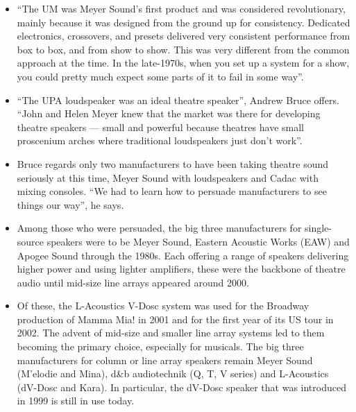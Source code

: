 \documentclass[12pt]{article}
\begin{document}
\begin{itemize}
            \item ``The UM was Meyer Sound's first product and was considered revolutionary, mainly because it was designed from the ground up for consistency. Dedicated electronics, crossovers, and presets delivered very consistent performance from box to box, and from show to show. This was very different from the common approach at the time. In the late-1970s, when you set up a system for a show, you could pretty much expect some parts of it to fail in some way''.
            \item ``The UPA loudspeaker was an ideal theatre speaker'', Andrew Bruce offers. ``John and Helen Meyer knew that the market was there for developing theatre speakers --- small and powerful because theatres have small proscenium arches where traditional loudspeakers just don't work''.
            \item Bruce regards only two manufacturers to have been taking theatre sound seriously at this time, Meyer Sound with loudspeakers and Cadac with mixing consoles. ``We had to learn how to persuade manufacturers to see things our way'', he says.
            \item Among those who were persuaded, the big three manufacturers for single-source speakers were to be Meyer Sound, Eastern Acoustic Works (EAW) and Apogee Sound through the 1980s. Each offering a range of speakers delivering higher power and using lighter amplifiers, these were the backbone of theatre audio until mid-size line arrays appeared around 2000.
            \item Of these, the L-Acoustics V-Dosc system was used for the Broadway production of Mamma Mia! in 2001 and for the first year of its US tour in 2002. The advent of mid-size and smaller line array systems led to them becoming the primary choice, especially for musicals. The big three manufacturers for column or line array speakers remain Meyer Sound (M'elodie and Mina), d\&b audiotechnik (Q, T, V series) and L-Acoustics (dV-Dosc and Kara). In particular, the dV-Dosc speaker that was introduced in 1999 is still in use today.
        \end{itemize}
    \nocite{*}
\newpage
\printbibliography[]
\end{document}

